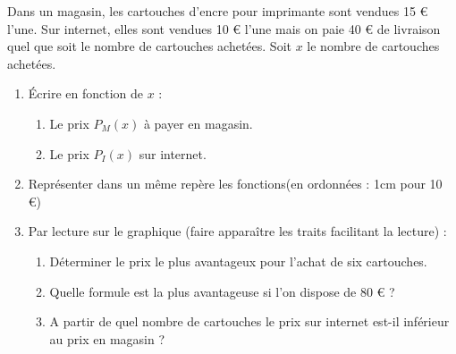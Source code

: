 
Dans un magasin, les cartouches d'encre pour imprimante sont vendues 15 € l'une. Sur internet, elles sont vendues 10 € l'une mais on paie 40 € de livraison quel que soit le nombre de cartouches achetées.
Soit $x$ le nombre de cartouches achetées.
\begin{enumerate}
\item  Écrire en fonction de $x$ : 
\begin{enumerate}
\item Le prix $P_M(x)$ à payer en magasin. 
\item Le prix $P_I(x)$ sur internet. 
\end{enumerate}
\item  Représenter dans un même repère les fonctions(en ordonnées : 1cm pour 10 €) 

\item  Par lecture sur le graphique (faire apparaître les traits facilitant la lecture) : 

\begin{enumerate}
\item Déterminer le prix le plus avantageux pour l'achat de six cartouches.
\item Quelle formule est la plus avantageuse si l'on dispose de 80 € ? 
\item A partir de quel nombre de cartouches le prix sur internet est-il inférieur au prix en magasin ? 
\end{enumerate}
\end{enumerate}